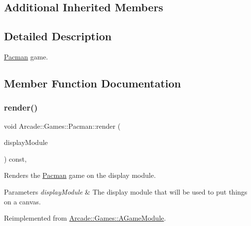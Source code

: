 \subsection*{Additional Inherited Members}


\subsection{Detailed Description}
\mbox{\hyperlink{classArcade_1_1Games_1_1Pacman}{Pacman}} game. 

\subsection{Member Function Documentation}
\mbox{\label{classArcade_1_1Games_1_1Pacman_a624e0f9332f888fc585a17290cf80041}} 
\subsubsection{\texorpdfstring{render()}{render()}}
{\footnotesize\ttfamily void Arcade\+::\+Games\+::\+Pacman\+::render (\begin{DoxyParamCaption}\item[{\mbox{\hyperlink{classArcade_1_1Display_1_1IDisplayModule}{Arcade\+::\+Display\+::\+I\+Display\+Module}} \&}]{display\+Module }\end{DoxyParamCaption}) const\hspace{0.3cm}{\ttfamily [final]}, {\ttfamily [virtual]}}



Renders the \mbox{\hyperlink{classArcade_1_1Games_1_1Pacman}{Pacman}} game on the display module. 


\begin{DoxyParams}{Parameters}
{\em display\+Module} & The display module that will be used to put things on a canvas. \\
\hline
\end{DoxyParams}


Reimplemented from \mbox{\hyperlink{classArcade_1_1Games_1_1AGameModule_a5897780d42d5faba3287c29b87f2b498}{Arcade\+::\+Games\+::\+A\+Game\+Module}}.

\mbox{\label{classArcade_1_1Games_1_1Pacman_aa1da58f8e97d6363bd4ef0538496490e}} 
